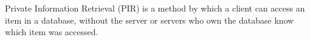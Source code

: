 Private Information Retrieval (PIR) is a method by which
a client can access an item in a database, without the server
or servers who own the database know which item was accessed.
